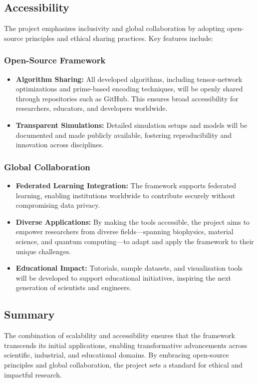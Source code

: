 \documentclass{article}
\theoremstyle{plain}
\begin{document}
\subsection{Accessibility}
The project emphasizes inclusivity and global collaboration by adopting open-source principles and ethical sharing practices. Key features include:

\subsubsection{Open-Source Framework}
\begin{itemize}
    \item \textbf{Algorithm Sharing:} All developed algorithms, including tensor-network optimizations and prime-based encoding techniques, will be openly shared through repositories such as GitHub. This ensures broad accessibility for researchers, educators, and developers worldwide.
    \item \textbf{Transparent Simulations:} Detailed simulation setups and models will be documented and made publicly available, fostering reproducibility and innovation across disciplines.
\end{itemize}

\subsubsection{Global Collaboration}
\begin{itemize}
    \item \textbf{Federated Learning Integration:} The framework supports federated learning, enabling institutions worldwide to contribute securely without compromising data privacy.
    \item \textbf{Diverse Applications:} By making the tools accessible, the project aims to empower researchers from diverse fields—spanning biophysics, material science, and quantum computing—to adapt and apply the framework to their unique challenges.
    \item \textbf{Educational Impact:} Tutorials, sample datasets, and visualization tools will be developed to support educational initiatives, inspiring the next generation of scientists and engineers.
\end{itemize}

\subsection{Summary}
The combination of scalability and accessibility ensures that the framework transcends its initial applications, enabling transformative advancements across scientific, industrial, and educational domains. By embracing open-source principles and global collaboration, the project sets a standard for ethical and impactful research.
\appendix
\end{document}
